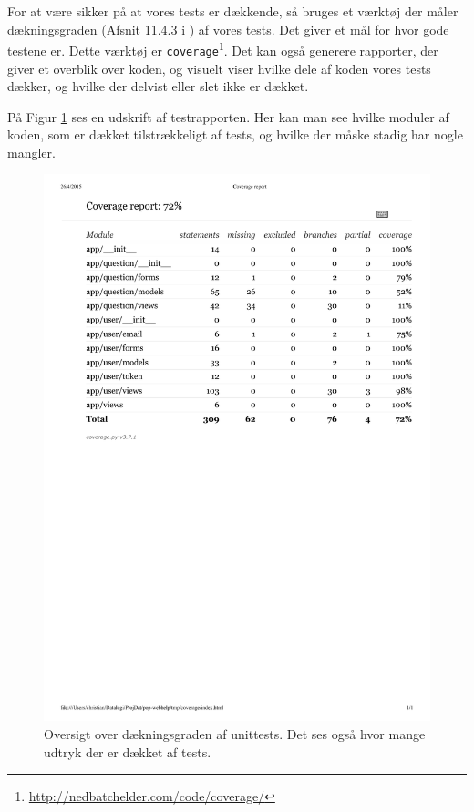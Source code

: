 \documentclass[11pt, a4paper]{article}
\begin{document}
For at være sikker på at vores tests er dækkende, så bruges et værktøj der måler dækningsgraden (Afsnit 11.4.3 i \cite{OOSE}) af vores tests. Det giver et mål for hvor gode testene er. Dette værktøj er \verb!coverage!\footnote{\url{http://nedbatchelder.com/code/coverage/}}. Det kan også generere rapporter, der giver et overblik over koden, og visuelt viser hvilke dele af koden vores tests dækker, og hvilke der delvist eller slet ikke er dækket.

På Figur \ref{fig:testcoverage} ses en udskrift af testrapporten. Her kan man see hvilke moduler af koden, som er dækket tilstrækkeligt af tests, og hvilke der måske stadig har nogle mangler.

\begin{figure}[h]
    \centering
    \includegraphics[width=1\linewidth]{figures/testcoverage.pdf}
    \caption{Oversigt over dækningsgraden af unittests. Det ses også hvor mange udtryk der er dækket af tests.}
    \label{fig:testcoverage}
\end{figure}
\end{document}
